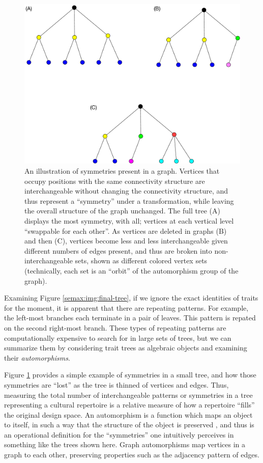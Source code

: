 \begin{figure}[htbp] 
  \centering 
  \includegraphics[scale=0.5]{graphics/semanticaxelrod/graph-symmetries.pdf} 
  \caption{An illustration of symmetries present in a graph.  Vertices that occupy positions with the same connectivity structure are interchangeable without changing the connectivity structure, and thus represent a ``symmetry'' under a transformation, while leaving the overall structure of the graph unchanged.  The full tree (A) displays the most symmetry, with all; vertices at each vertical level ``swappable for each other''.  As vertices are deleted in graphs (B) and then (C), vertices become less and less interchangeable given different numbers of edges present, and thus are broken into non-interchangeable sets, shown as different colored vertex sets (technically, each set is an ``orbit'' of the automorphism group of the graph).} 
  \label{semax:img:graph-symmetries} 
  \end{figure}

Examining Figure \ref{semax:img:final-tree}, if we ignore the exact identities
of traits for the moment, it is apparent that there are repeating
patterns. For example, the left-most branches each terminate in a pair
of leaves. This pattern is repated on the second right-most branch.
These types of repeating patterns are computationally expensive to
search for in large sets of trees, but we can summarize them by
considering trait trees as algebraic objects and examining their
\emph{automorphisms}.

Figure \ref{semax:img:graph-symmetries} provides a simple example of symmetries in a small tree, and how those symmetries are ``lost'' as the tree is thinned of vertices and edges.  Thus, measuring the total number of interchangeable patterns or symmetries in a tree representing a cultural repertoire is a relative measure of how a repertoire ``fills'' the original design space.  
An automorphism is a function which maps an object to itself, in such a
way that the structure of the object is preserved
\citep{rotman1995introduction}, and thus is an operational definition for the ``symmetries'' one intuitively perceives in something like the trees shown here. Graph automorphisms map vertices in a
graph to each other, preserving properties such as the adjacency pattern
of edges. 

